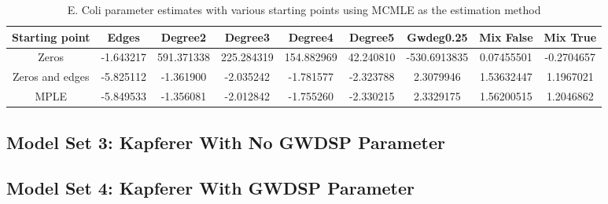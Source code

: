 \begin{table}[H]
\centering
\scriptsize
\begin{tabular}{|| c | c | c | c | c | c | c | c | c ||}
\hline
Starting point & Edges & Degree2 & Degree3 & Degree4 & Degree5 & Gwdeg0.25 & Mix False & Mix True \\
\hline
Zeros & -1.643217 & 591.371338 & 225.284319 & 154.882969 & 42.240810 & -530.6913835 & 0.07455501 & -0.2704657 \\
\hline
Zeros and edges & -5.825112 & -1.361900 & -2.035242 & -1.781577 & -2.323788 & 2.3079946 & 1.53632447 & 1.1967021 \\
\hline
MPLE & -5.849533	 & -1.356081 & -2.012842 & -1.755260 & -2.330215 & 2.3329175 & 1.56200515 & 1.2046862 \\
\hline
\end{tabular}
\label{t2:params_ecoli_mcmle}
\caption{E. Coli parameter estimates with various starting points using MCMLE as the estimation method}
\end{table}


\subsection{Model Set 3: Kapferer With No GWDSP Parameter}


\subsection{Model Set 4: Kapferer With GWDSP Parameter}


